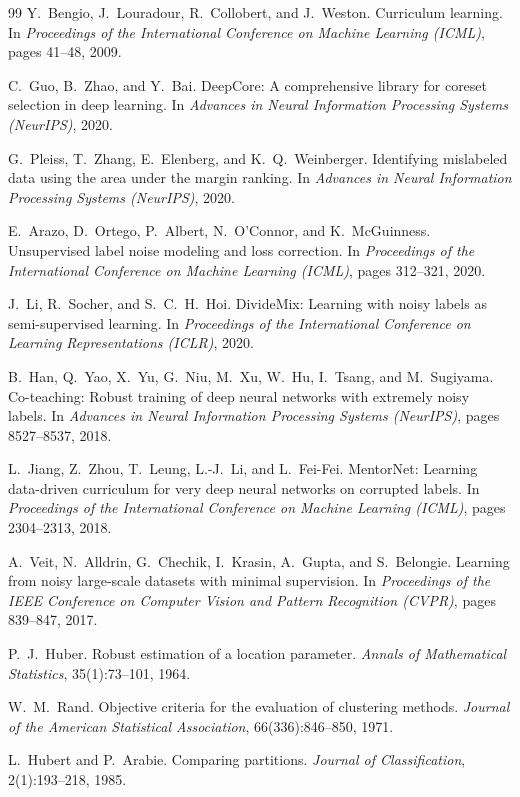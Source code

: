 \documentclass{article}
\begin{document}
\begin{thebibliography}{99}
Y.~Bengio, J.~Louradour, R.~Collobert, and J.~Weston. Curriculum learning. In \textit{Proceedings of the International Conference on Machine Learning (ICML)}, pages 41--48, 2009.

C.~Guo, B.~Zhao, and Y.~Bai. DeepCore: A comprehensive library for coreset selection in deep learning. In \textit{Advances in Neural Information Processing Systems (NeurIPS)}, 2020.

G.~Pleiss, T.~Zhang, E.~Elenberg, and K.~Q.~Weinberger. Identifying mislabeled data using the area under the margin ranking. In \textit{Advances in Neural Information Processing Systems (NeurIPS)}, 2020.

E.~Arazo, D.~Ortego, P.~Albert, N.~O'Connor, and K.~McGuinness. Unsupervised label noise modeling and loss correction. In \textit{Proceedings of the International Conference on Machine Learning (ICML)}, pages 312--321, 2020.

J.~Li, R.~Socher, and S.~C.~H.~Hoi. DivideMix: Learning with noisy labels as semi-supervised learning. In \textit{Proceedings of the International Conference on Learning Representations (ICLR)}, 2020.

B.~Han, Q.~Yao, X.~Yu, G.~Niu, M.~Xu, W.~Hu, I.~Tsang, and M.~Sugiyama. Co-teaching: Robust training of deep neural networks with extremely noisy labels. In \textit{Advances in Neural Information Processing Systems (NeurIPS)}, pages 8527--8537, 2018.

L.~Jiang, Z.~Zhou, T.~Leung, L.-J.~Li, and L.~Fei-Fei. MentorNet: Learning data-driven curriculum for very deep neural networks on corrupted labels. In \textit{Proceedings of the International Conference on Machine Learning (ICML)}, pages 2304--2313, 2018.

A.~Veit, N.~Alldrin, G.~Chechik, I.~Krasin, A.~Gupta, and S.~Belongie. Learning from noisy large-scale datasets with minimal supervision. In \textit{Proceedings of the IEEE Conference on Computer Vision and Pattern Recognition (CVPR)}, pages 839--847, 2017.

P.~J.~Huber. Robust estimation of a location parameter. \textit{Annals of Mathematical Statistics}, 35(1):73--101, 1964.

W.~M.~Rand. Objective criteria for the evaluation of clustering methods. \textit{Journal of the American Statistical Association}, 66(336):846--850, 1971.

L.~Hubert and P.~Arabie. Comparing partitions. \textit{Journal of Classification}, 2(1):193--218, 1985.

\end{thebibliography}
\end{document}
